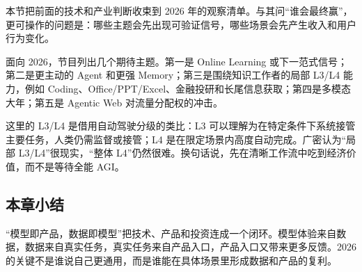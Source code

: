 本节把前面的技术和产业判断收束到 2026 年的观察清单。与其问“谁会最终赢”，更可操作的问题是：哪些主题会先出现可验证信号，哪些场景会先产生收入和用户行为变化。

面向 2026，节目列出几个期待主题。第一是 Online Learning 或下一范式信号；第二是更主动的 Agent 和更强 Memory；第三是围绕知识工作者的局部 L3/L4 能力，例如 Coding、Office/PPT/Excel、金融投研和长尾信息获取；第四是多模态大年；第五是 Agentic Web 对流量分配权的冲击。

这里的 L3/L4 是借用自动驾驶分级的类比：L3 可以理解为在特定条件下系统接管主要任务，人类仍需监督或接管；L4 是在限定场景内高度自动完成。广密认为“局部 L3/L4”很现实，“整体 L4”仍然很难。换句话说，先在清晰工作流中吃到经济价值，而不是等待全能 AGI。

\subsection{本章小结}

“模型即产品，数据即模型”把技术、产品和投资连成一个闭环。模型体验来自数据，数据来自真实任务，真实任务来自产品入口，产品入口又带来更多反馈。2026 的关键不是谁说自己更通用，而是谁能在具体场景里形成数据和产品的复利。

